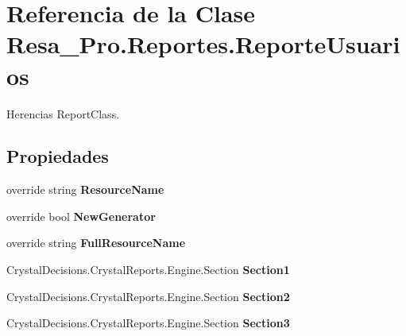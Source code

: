 \section{Referencia de la Clase Resa\+\_\+\+Pro.\+Reportes.\+Reporte\+Usuarios}
\label{class_resa___pro_1_1_reportes_1_1_reporte_usuarios}


Herencias Report\+Class.

\subsection*{Propiedades}
\begin{DoxyCompactItemize}
\item 
override string {\bfseries Resource\+Name}\hspace{0.3cm}{\ttfamily  [get, set]}\label{class_resa___pro_1_1_reportes_1_1_reporte_usuarios_a6b15c5595eebac539179cfc7f52059f7}

\item 
override bool {\bfseries New\+Generator}\hspace{0.3cm}{\ttfamily  [get, set]}\label{class_resa___pro_1_1_reportes_1_1_reporte_usuarios_af656af6abe7313043f09088a3c942fc4}

\item 
override string {\bfseries Full\+Resource\+Name}\hspace{0.3cm}{\ttfamily  [get, set]}\label{class_resa___pro_1_1_reportes_1_1_reporte_usuarios_a9ed3626af78e1fa47517f87a23deb010}

\item 
Crystal\+Decisions.\+Crystal\+Reports.\+Engine.\+Section {\bfseries Section1}\hspace{0.3cm}{\ttfamily  [get]}\label{class_resa___pro_1_1_reportes_1_1_reporte_usuarios_a0dafdd12b6f6ee60e0fa904740eedb3f}

\item 
Crystal\+Decisions.\+Crystal\+Reports.\+Engine.\+Section {\bfseries Section2}\hspace{0.3cm}{\ttfamily  [get]}\label{class_resa___pro_1_1_reportes_1_1_reporte_usuarios_a90f0d3952be17f5b30527e33cfc5a47e}

\item 
Crystal\+Decisions.\+Crystal\+Reports.\+Engine.\+Section {\bfseries Section3}\hspace{0.3cm}{\ttfamily  [get]}\label{class_resa___pro_1_1_reportes_1_1_reporte_usuarios_a054c6a8a5d727cad520155079224d769}


\end{DoxyCompactItemize}
